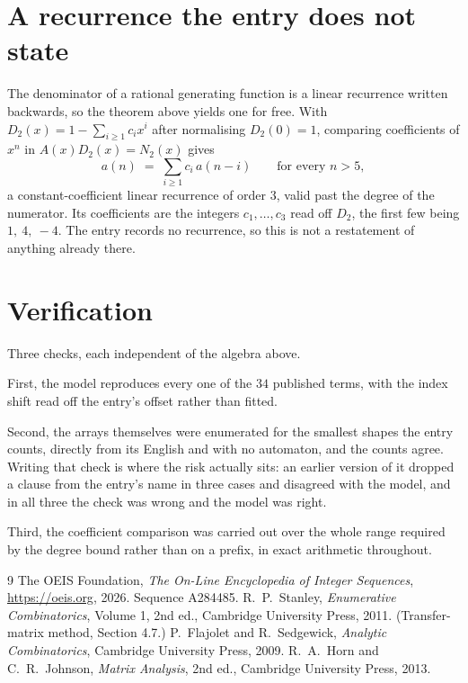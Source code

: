 \documentclass[11pt,a4paper]{article}
\theoremstyle{plain}
\theoremstyle{definition}
\begin{document}
\section{A recurrence the entry does not state}

The denominator of a rational generating function is a linear recurrence written backwards, so
the theorem above yields one for free. With $D_2(x)=1-\sum_{i\ge1}c_ix^i$ after normalising
$D_2(0)=1$, comparing coefficients of $x^n$ in $A(x)D_2(x)=N_2(x)$ gives
\[
a(n)\;=\;\sum_{i\ge1}c_i\,a(n-i)\qquad\text{for every }n>5,
\]
a constant-coefficient linear recurrence of order $3$, valid past the degree of the
numerator. Its coefficients are the integers $c_1,\dots,c_{3}$ read off $D_2$, the first few being $1,\ 4,\ -4$. The entry records no recurrence, so this is not a restatement of anything
already there.

\section{Verification}

Three checks, each independent of the algebra above.

First, the model reproduces every one of the $34$ published terms, with the index shift
read off the entry's offset rather than fitted.

Second, the arrays themselves were enumerated for the smallest shapes the entry counts,
directly from its English and with no automaton, and the counts agree. Writing that check is
where the risk actually sits: an earlier version of it dropped a clause from the entry's name
in three cases and disagreed with the model, and in all three the check was wrong and the model
was right.

Third, the coefficient comparison was carried out over the whole range required by the degree
bound rather than on a prefix, in exact arithmetic throughout.

\begin{thebibliography}{9}
 The OEIS Foundation, \emph{The On-Line Encyclopedia of Integer
Sequences}, \url{https://oeis.org}, 2026. Sequence A284485.
 R.~P.~Stanley, \emph{Enumerative Combinatorics}, Volume 1, 2nd ed.,
Cambridge University Press, 2011. (Transfer-matrix method, Section 4.7.)
 P.~Flajolet and R.~Sedgewick, \emph{Analytic Combinatorics}, Cambridge
University Press, 2009.
 R.~A.~Horn and C.~R.~Johnson, \emph{Matrix Analysis}, 2nd ed., Cambridge
University Press, 2013.
\end{thebibliography}
\end{document}
